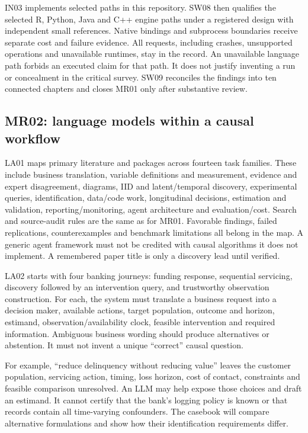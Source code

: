 \documentclass[
  11pt,
  a4paper,
]{article}
\begin{document}
IN03 implements selected paths in this repository. SW08 then qualifies
the selected R, Python, Java and C++ engine paths under a registered
design with independent small references. Native bindings and subprocess
boundaries receive separate cost and failure evidence. All requests,
including crashes, unsupported operations and unavailable runtimes, stay
in the record. An unavailable language path forbids an executed claim
for that path. It does not justify inventing a run or concealment in the
critical survey. SW09 reconciles the findings into ten connected
chapters and closes MR01 only after substantive review.

\hypertarget{mr02-language-models-within-a-causal-workflow}{%
\subsection{MR02: language models within a causal
workflow}\label{mr02-language-models-within-a-causal-workflow}}

LA01 maps primary literature and packages across fourteen task families.
These include business translation, variable definitions and
measurement, evidence and expert disagreement, diagrams, IID and
latent/temporal discovery, experimental queries, identification,
data/code work, longitudinal decisions, estimation and validation,
reporting/monitoring, agent architecture and evaluation/cost. Search and
source-audit rules are the same as for MR01. Favorable findings, failed
replications, counterexamples and benchmark limitations all belong in
the map. A generic agent framework must not be credited with causal
algorithms it does not implement. A remembered paper title is only a
discovery lead until verified.

LA02 starts with four banking journeys: funding response, sequential
servicing, discovery followed by an intervention query, and trustworthy
observation construction. For each, the system must translate a business
request into a decision maker, available actions, target population,
outcome and horizon, estimand, observation/availability clock, feasible
intervention and required information. Ambiguous business wording should
produce alternatives or abstention. It must not invent a unique
``correct'' causal question.

For example, ``reduce delinquency without reducing value'' leaves the
customer population, servicing action, timing, loss horizon, cost of
contact, constraints and feasible comparison unresolved. An LLM may help
expose those choices and draft an estimand. It cannot certify that the
bank's logging policy is known or that records contain all time-varying
confounders. The casebook will compare alternative formulations and show
how their identification requirements differ.
\end{document}
